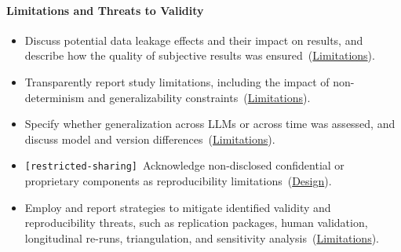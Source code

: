 \documentclass[smallextended]{svjour3}
\makeatletter
\newcommand{\must}{\textbf{must}\xspace}
\newcommand{\should}{\textbf{should}\xspace}
\newcommand{\iconM}{\usebox{\iconMbox}\xspace}
\newcommand{\iconS}{\usebox{\iconSbox}\xspace}
\newcommand{\iconM}{●\xspace}
\newcommand{\iconS}{○\xspace}
\newcommand{\condition}[1]{\texttt{\small[#1]}\,}
\newcommand{\condition}[1]{@@cond:#1@@}
\newcommand{\refdesign}{\hyperref[sec:report-system-and-prompt-design]{Design}}
\newcommand{\reflimitations}{\hyperref[sec:report-limitations-and-mitigations]{Limitations}}
\newcommand{\refdesign}{\href{/guidelines/design/}{Design}}
\newcommand{\reflimitations}{\href{/guidelines/limitations/}{Limitations}}
\makeatother
\begin{document}
\begin{appendices}
\paragraph{\textbf{Limitations and Threats to Validity}}
\begin{itemize}[label={},leftmargin=*]
    \item \iconM Discuss potential data leakage effects and their impact on results, and describe how the quality of subjective results was ensured~(\reflimitations).
    \item \iconM Transparently report study limitations, including the impact of non-determinism and generalizability constraints~(\reflimitations).
    \item \iconM Specify whether generalization across LLMs or across time was assessed, and discuss model and version differences~(\reflimitations).
    \item \iconM \condition{restricted-sharing} Acknowledge non-disclosed confidential or proprietary components as reproducibility limitations~(\refdesign).
    \item \iconS Employ and report strategies to mitigate identified validity and reproducibility threats, such as replication packages, human validation, longitudinal re-runs, triangulation, and sensitivity analysis~(\reflimitations).
\end{itemize}
\space%

\end{appendices}
\space%
\end{document}
